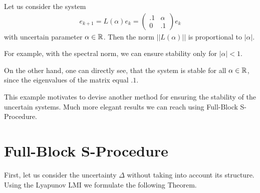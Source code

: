 \begin{exam}
	\label{exp:rob:bad_example}
Let us consider the system 
\begin{align}
e_{k+1}  = L(\alpha) e_k = \begin{pmatrix}
.1 & \alpha \\ 0 & .1
\end{pmatrix}e_k
\end{align}
with uncertain parameter $\alpha \in {\mathbb{R}}$.
Then the norm $||L(\alpha)||$ is proportional to $|\alpha|$.

For example, with the spectral norm, we can ensure stability only for $|\alpha|<1$. 


On the other hand, one can directly see, that the system is stable for all $\alpha \in {\mathbb{R}}$, since the eigenvalues of the matrix equal $.1$. 	
\end{exam}

This example motivates to devise another method for ensuring the stability of the uncertain systems. 
Much more elegant results we can reach using Full-Block S-Procedure. 

 

\section{Full-Block S-Procedure}

First, let us consider the uncertainty $\Delta$ without taking into account its structure. 
Using the Lyapunov LMI we formulate the following Theorem. 


